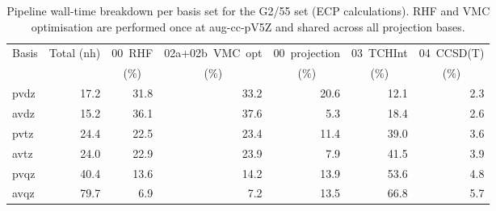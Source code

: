 \begin{table}[h]
\centering
\caption{Pipeline wall-time breakdown per basis set for the G2/55 set (ECP calculations). RHF and VMC optimisation are performed once at aug-cc-pV5Z and shared across all projection bases.}
\label{tab:timing}
\begin{tabular}{@{}l r r r r r r @{}}
\toprule
Basis & Total (nh) & \multicolumn{1}{c}{00\ RHF} & \multicolumn{1}{c}{02a+02b\ VMC\ opt} & \multicolumn{1}{c}{00\ projection} & \multicolumn{1}{c}{03\ TCHInt} & \multicolumn{1}{c}{04\ CCSD(T)} \\
 & & \multicolumn{1}{c}{(\%)} & \multicolumn{1}{c}{(\%)} & \multicolumn{1}{c}{(\%)} & \multicolumn{1}{c}{(\%)} & \multicolumn{1}{c}{(\%)} \\
\midrule
pvdz & 17.2 & 31.8 & 33.2 & 20.6 & 12.1 & 2.3 \\
avdz & 15.2 & 36.1 & 37.6 & 5.3 & 18.4 & 2.6 \\
pvtz & 24.4 & 22.5 & 23.4 & 11.4 & 39.0 & 3.6 \\
avtz & 24.0 & 22.9 & 23.9 & 7.9 & 41.5 & 3.9 \\
pvqz & 40.4 & 13.6 & 14.2 & 13.9 & 53.6 & 4.8 \\
avqz & 79.7 & 6.9 & 7.2 & 13.5 & 66.8 & 5.7 \\
\bottomrule
\end{tabular}
\end{table}
